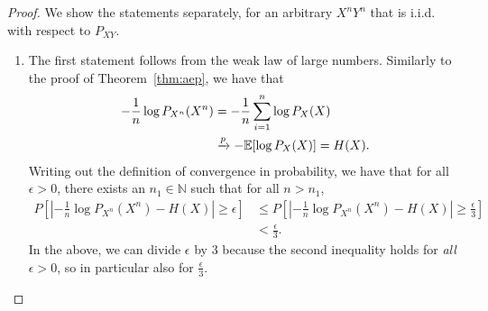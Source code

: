 \begin{proof}
We show the statements separately, for an arbitrary $X^nY^n$ that is i.i.d. with respect to $P_{XY}$.
\begin{enumerate}
\item The first statement follows from the weak law of large numbers. Similarly to the proof of Theorem~\ref{thm:aep}, we have that
\begin{align}
-\frac{1}{n} \log P_{X^n}(X^n) &= - \frac{1}{n} \sum_{i=1}^n \log P_X(X)\nonumber\\
&\xrightarrow{p} - \mathbb{E}[\log P_X(X)] = H(X).
\end{align}
Writing out the definition of convergence in probability, we have that for all $\epsilon > 0$, there exists an $n_1 \in \mathbb{N}$ such that for all $n > n_1$,
\begin{align}\label{eq:joint-aep-1}
P\left[\left|-\frac{1}{n} \log P_{X^n}(X^n) - H(X)\right| \geq \epsilon \right] &\leq P\left[\left|-\frac{1}{n} \log P_{X^n}(X^n) - H(X)\right| \geq \frac{\epsilon}{3} \right]\nonumber\\
&< \frac{\epsilon}{3}.
\end{align}
In the above, we can divide $\epsilon$ by 3 because the second inequality holds for \emph{all} $\epsilon > 0$, so in particular also for $\frac{\epsilon}{3}$.


\end{enumerate}
\end{proof}
